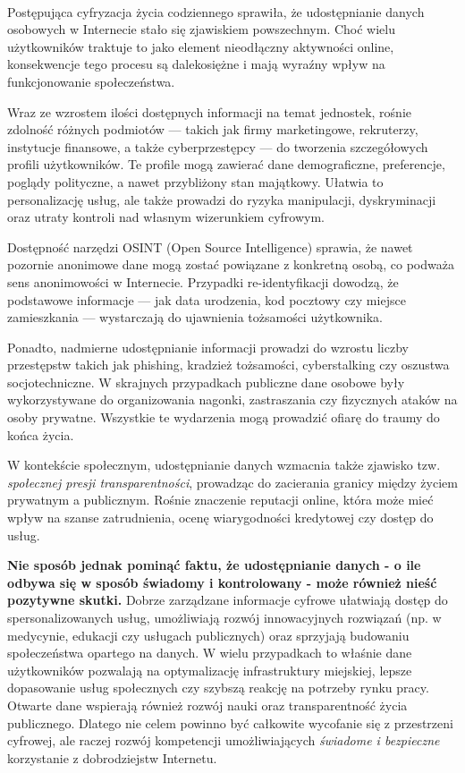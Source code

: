 \paragraph{}
Postępująca cyfryzacja życia codziennego sprawiła, że udostępnianie danych osobowych w Internecie stało się zjawiskiem powszechnym. Choć wielu użytkowników traktuje to jako element nieodłączny aktywności online, konsekwencje tego procesu są dalekosiężne i mają wyraźny wpływ na funkcjonowanie społeczeństwa.

Wraz ze wzrostem ilości dostępnych informacji na temat jednostek, rośnie zdolność różnych podmiotów — takich jak firmy marketingowe, rekruterzy, instytucje finansowe, a także cyberprzestępcy — do tworzenia szczegółowych profili użytkowników. Te profile mogą zawierać dane demograficzne, preferencje, poglądy polityczne, a nawet przybliżony stan majątkowy. Ułatwia to personalizację usług, ale także prowadzi do ryzyka manipulacji, dyskryminacji oraz utraty kontroli nad własnym wizerunkiem cyfrowym.

Dostępność narzędzi OSINT (Open Source Intelligence) sprawia, że nawet pozornie anonimowe dane mogą zostać powiązane z konkretną osobą, co podważa sens anonimowości w Internecie. Przypadki re-identyfikacji dowodzą, że podstawowe informacje — jak data urodzenia, kod pocztowy czy miejsce zamieszkania — wystarczają do ujawnienia tożsamości użytkownika.

Ponadto, nadmierne udostępnianie informacji prowadzi do wzrostu liczby przestępstw takich jak phishing, kradzież tożsamości, cyberstalking czy oszustwa socjotechniczne. W skrajnych przypadkach publiczne dane osobowe były wykorzystywane do organizowania nagonki, zastraszania czy fizycznych ataków na osoby prywatne. Wszystkie te wydarzenia mogą prowadzić ofiarę do traumy do końca życia.

W kontekście społecznym, udostępnianie danych wzmacnia także zjawisko tzw. \textit{społecznej presji transparentności}, prowadząc do zacierania granicy między życiem prywatnym a publicznym. Rośnie znaczenie reputacji online, która może mieć wpływ na szanse zatrudnienia, ocenę wiarygodności kredytowej czy dostęp do usług.

\textbf{Nie sposób jednak pominąć faktu, że udostępnianie danych - o ile odbywa się w sposób świadomy i kontrolowany - może również nieść pozytywne skutki.} Dobrze zarządzane informacje cyfrowe ułatwiają dostęp do spersonalizowanych usług, umożliwiają rozwój innowacyjnych rozwiązań (np. w medycynie, edukacji czy usługach publicznych) oraz sprzyjają budowaniu społeczeństwa opartego na danych. W wielu przypadkach to właśnie dane użytkowników pozwalają na optymalizację infrastruktury miejskiej, lepsze dopasowanie usług społecznych czy szybszą reakcję na potrzeby rynku pracy. Otwarte dane wspierają również rozwój nauki oraz transparentność życia publicznego. Dlatego nie celem powinno być całkowite wycofanie się z przestrzeni cyfrowej, ale raczej rozwój kompetencji umożliwiających \emph{świadome i bezpieczne} korzystanie z dobrodziejstw Internetu.

